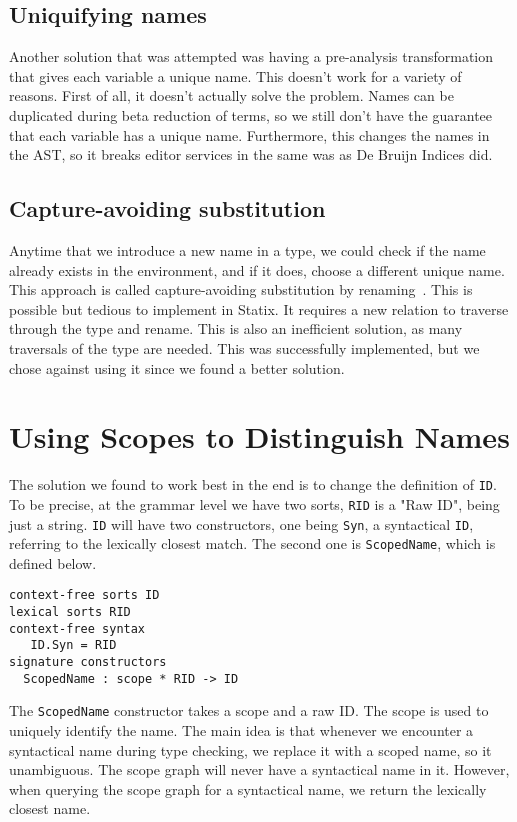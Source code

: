 \subsection{Uniquifying names}

Another solution that was attempted was having a pre-analysis transformation that gives each variable a unique name. This doesn't work for a variety of reasons. First of all, it doesn't actually solve the problem. Names can be duplicated during beta reduction of terms, so we still don't have the guarantee that each variable has a unique name. Furthermore, this changes the names in the AST, so it breaks editor services in the same was as De Bruijn Indices did.

\subsection{Capture-avoiding substitution}

Anytime that we introduce a new name in a type, we could check if the name already exists in the environment, and if it does, choose a different unique name. This approach is called capture-avoiding substitution by renaming~\cite{capture_avoiding_sub}. This is possible but tedious to implement in Statix. It requires a new relation to traverse through the type and rename. This is also an inefficient solution, as many traversals of the type are needed. This was successfully implemented, but we chose against using it since we found a better solution.

\section{Using Scopes to Distinguish Names}
\label{scopes_for_names}

The solution we found to work best in the end is to change the definition of \verb|ID|. To be precise, at the grammar level we have two sorts, \verb|RID| is a "Raw ID", being just a string. \verb|ID| will have two constructors, one being \verb|Syn|, a syntactical \verb|ID|, referring to the lexically closest match. The second one is \verb|ScopedName|, which is defined below.

\begin{lstlisting}
context-free sorts ID
lexical sorts RID
context-free syntax
   ID.Syn = RID
signature constructors
  ScopedName : scope * RID -> ID
\end{lstlisting}

The \verb|ScopedName| constructor takes a scope and a raw ID. The scope is used to uniquely identify the name. The main idea is that whenever we encounter a syntactical name during type checking, we replace it with a scoped name, so it unambiguous. The scope graph will never have a syntactical name in it. However, when querying the scope graph for a syntactical name, we return the lexically closest name.

